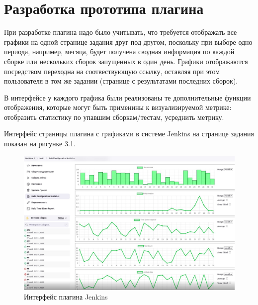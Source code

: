 \chapter{Разработка прототипа плагина} \label{ch3}


При разработке плагина надо было учитывать, что требуется отображать все графики на одной странице задания друг под другом, поскольку при выборе одно периода, например, месяца, будет получена сводная информация по каждой сборке или нескольких сборок запущенных в один день. Графики отображаются посредством переходна на соотвествующую ссылку, оставляя при этом пользователя в том же задании (странице с результатами последних сборок).

В интерфейсе у каждого графика были реализованы те дополнительные функции отображения, которые могут быть применины к визуализируемой метрике: отобразить статистику по упавшим сборкам/тестам, усреднить метрику.

Интерфейс страницы плагина с графиками в системе Jenkins на странице задания показан на рисунке 3.1.


\begin{figure}[ht!] 
	\center
	\includegraphics [scale=0.47] {my_folder/images//ui}
	\caption{Интерфейс плагина Jenkins} 
	\label{fig:ArchitectureJenkins}  
\end{figure}

